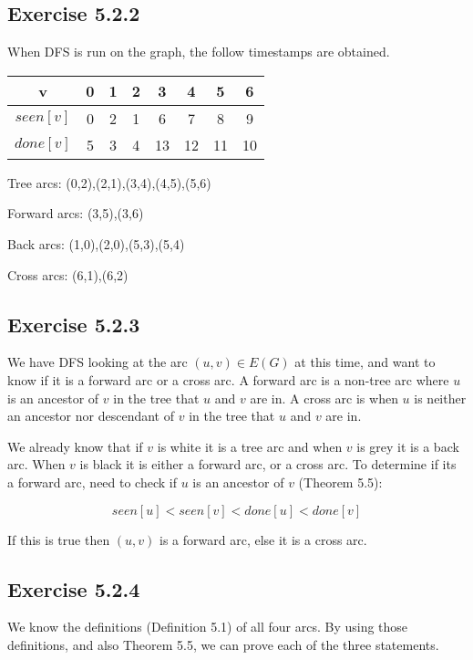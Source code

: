 \documentclass{article}
\begin{document}
\subsection*{Exercise 5.2.2} 

When DFS is run on the graph, the follow timestamps are obtained.

\begin{tabular}{|c|c|c|c|c|c|c|c|}
\hline
v& 0& 1& 2& 3& 4& 5& 6 \\
\hline
\(seen[v]\)& 0& 2& 1& 6& 7& 8& 9 \\
\hline
\(done[v]\)& 5& 3& 4& 13& 12& 11& 10 \\
\hline
\end{tabular}

Tree arcs:
(0,2),(2,1),(3,4),(4,5),(5,6)

Forward arcs:
(3,5),(3,6)

Back arcs:
(1,0),(2,0),(5,3),(5,4)

Cross arcs:
(6,1),(6,2)



\subsection*{Exercise 5.2.3}

We have DFS looking at the arc \((u,v)\in E(G)\) at this time, and want to know if it is a forward arc or a cross arc. A forward arc is a non-tree arc where \(u\) is an ancestor of \(v\) in the tree that \(u\) and \(v\) are in. A cross arc is when \(u\) is neither an ancestor nor descendant of \(v\) in the tree that \(u\) and \(v\) are in.

We already know that if \(v\) is white it is a tree arc and when \(v\) is grey it is a back arc. When \(v\) is black it is either a forward arc, or a cross arc. To determine if its a forward arc, need to check if \(u\) is an ancestor of \(v\) (Theorem 5.5):

\[seen[u] < seen[v] < done[u] < done[v]\]

If this is true then \((u,v)\) is a forward arc, else it is a cross arc.


\subsection*{Exercise 5.2.4}

We know the definitions (Definition 5.1) of all four arcs. By using those definitions, and also Theorem 5.5, we can prove each of the three statements.
\end{document}
